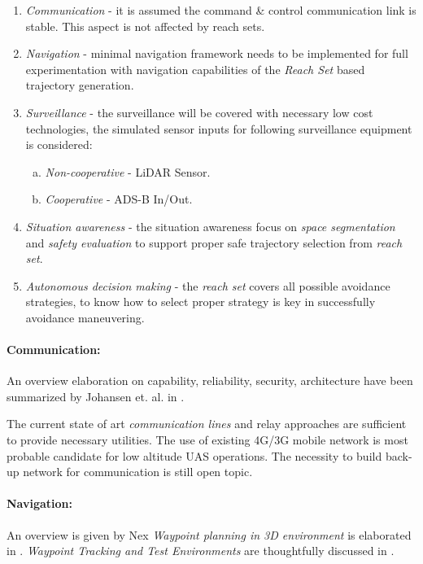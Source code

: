 \begin{enumerate}
    \item \emph{Communication} - it is assumed the command \& control communication link is stable. This aspect is not affected by reach sets.
    
    \item \emph{Navigation} - minimal navigation framework needs to be implemented for full experimentation with navigation capabilities of the \emph{Reach Set} based trajectory generation.
    
    \item \emph{Surveillance} - the surveillance will be covered with necessary low cost technologies, the simulated sensor inputs for following surveillance equipment is considered:
    \begin{enumerate}[a.]
        \item \emph{Non-cooperative} - LiDAR Sensor.
        \item \emph{Cooperative} - ADS-B In/Out.
    \end{enumerate}
    
    \item \emph{Situation  awareness} - the situation awareness focus on \emph{space segmentation} and \emph{safety evaluation} to support proper safe trajectory selection from \emph{reach set}.
    
    \item \emph{Autonomous decision making} - the \emph{reach set} covers all possible avoidance strategies, to know how to select proper strategy is key in successfully avoidance maneuvering.
\end{enumerate}

\paragraph{Communication:} An overview elaboration on capability, reliability, security, architecture have been summarized  by Johansen et. al. in \cite{johansenetal2018surveyCommunicaiton}.

The current state of art \emph{communication lines} and relay approaches are sufficient to provide necessary utilities. The use of existing 4G/3G mobile network is most probable candidate for low altitude UAS operations. The necessity to build back-up network for communication is still open topic.

\paragraph{Navigation:} An overview is given by Nex \cite{nex2014uav} \emph{Waypoint planning in 3D environment} is elaborated in \cite{bodin2007navigating}. \emph{Waypoint Tracking and Test Environments} are thoughtfully discussed in \cite{how2008real,girard2004border,andrade2017autonomous,klausen2017nonlinear}. 

